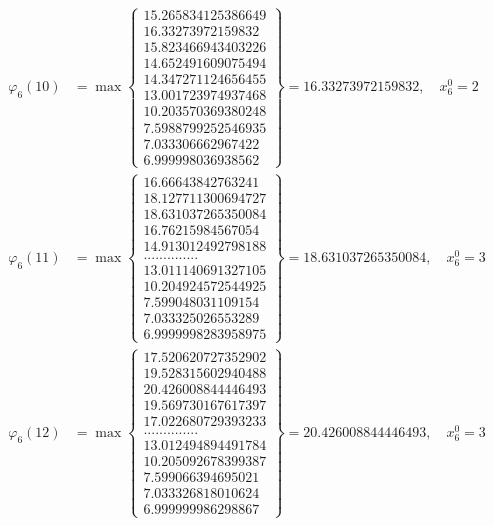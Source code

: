 \documentclass{article}
\begin{document}
\begin{align*}
  
  
  
\varphi_{6}(10) &= \max \left\{ \begin{array}{c}
15.265834125386649 \\
 16.33273972159832 \\
 15.823466943403226 \\
 14.652491609075494 \\
 14.347271124656455 \\
 13.001723974937468 \\
 10.203570369380248 \\
 7.5988799252546935 \\
 7.033306662967422 \\
 6.999998036938562
\end{array} \right\} = 16.33273972159832, \quad x_{6}^0 = 2\\
  
  
  
  
\varphi_{6}(11) &= \max \left\{ \begin{array}{c}
16.66643842763241 \\
 18.127711300694727 \\
 18.631037265350084 \\
 16.76215984567054 \\
 14.913012492798188 \\
 .............. \\
 13.011140691327105 \\
 10.204924572544925 \\
 7.599048031109154 \\
 7.033325026553289 \\
 6.9999998283958975
\end{array} \right\} = 18.631037265350084, \quad x_{6}^0 = 3\\
  
  
  
  
\varphi_{6}(12) &= \max \left\{ \begin{array}{c}
17.520620727352902 \\
 19.528315602940488 \\
 20.426008844446493 \\
 19.569730167617397 \\
 17.022680729393233 \\
 .............. \\
 13.012494894491784 \\
 10.205092678399387 \\
 7.599066394695021 \\
 7.033326818010624 \\
 6.999999986298867
\end{array} \right\} = 20.426008844446493, \quad x_{6}^0 = 3\\
  

\end{align*}
\end{document}
